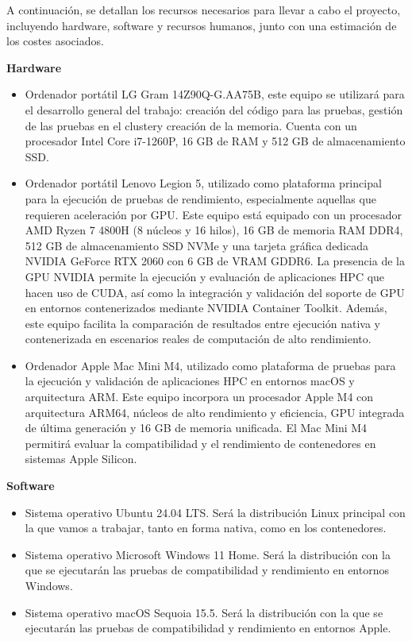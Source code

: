 A continuación, se detallan los recursos necesarios para llevar a cabo el proyecto, incluyendo hardware, software y recursos humanos, junto con una estimación de los costes asociados.

\textbf{Hardware}

\begin{itemize}
    \item Ordenador portátil LG Gram 14Z90Q-G.AA75B, este equipo se utilizará para el desarrollo general del trabajo: creación del código para las pruebas, gestión de las pruebas en el clustery creación de la memoria. Cuenta con un procesador Intel Core i7-1260P, 16 GB de RAM y 512 GB de almacenamiento SSD.

    \item Ordenador portátil Lenovo Legion 5, utilizado como plataforma principal para la ejecución de pruebas de rendimiento, especialmente aquellas que requieren aceleración por GPU. Este equipo está equipado con un procesador AMD Ryzen 7 4800H (8 núcleos y 16 hilos), 16 GB de memoria RAM DDR4, 512 GB de almacenamiento SSD NVMe y una tarjeta gráfica dedicada NVIDIA GeForce RTX 2060 con 6 GB de VRAM GDDR6. La presencia de la GPU NVIDIA permite la ejecución y evaluación de aplicaciones HPC que hacen uso de CUDA, así como la integración y validación del soporte de GPU en entornos contenerizados mediante NVIDIA Container Toolkit. Además, este equipo facilita la comparación de resultados entre ejecución nativa y contenerizada en escenarios reales de computación de alto rendimiento.

    \item Ordenador Apple Mac Mini M4, utilizado como plataforma de pruebas para la ejecución y validación de aplicaciones HPC en entornos macOS y arquitectura ARM. Este equipo incorpora un procesador Apple M4 con arquitectura ARM64, núcleos de alto rendimiento y eficiencia, GPU integrada de última generación y 16 GB de memoria unificada. El Mac Mini M4 permitirá evaluar la compatibilidad y el rendimiento de contenedores en sistemas Apple Silicon.
\end{itemize}

\textbf{Software}

\begin{itemize}
    \item Sistema operativo Ubuntu 24.04 LTS. Será la distribución Linux principal con la que vamos a trabajar, tanto en forma nativa, como en los contenedores.

    \item Sistema operativo Microsoft Windows 11 Home. Será la distribución con la que se ejecutarán las pruebas de compatibilidad y rendimiento en entornos Windows.

    \item Sistema operativo macOS Sequoia 15.5. Será la distribución con la que se ejecutarán las pruebas de compatibilidad y rendimiento en entornos Apple.
\end{itemize}

